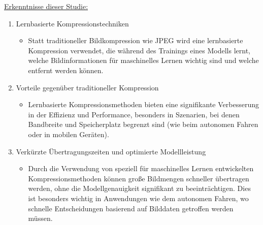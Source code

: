         \underline{Erkenntnisse dieser Studie:}
        \begin{enumerate}
            \item Lernbasierte Kompressionstechniken
            \begin{itemize}
                \item Statt traditioneller Bildkompression wie JPEG wird eine lernbasierte Kompression verwendet, die während des Trainings eines Modells lernt, welche Bildinformationen für maschinelles Lernen wichtig sind und welche entfernt werden können.
            \end{itemize}
            \item Vorteile gegenüber traditioneller Kompression
            \begin{itemize}
                \item Lernbasierte Kompressionsmethoden bieten eine signifikante Verbesserung in der Effizienz und Performance, besonders in Szenarien, bei denen Bandbreite und Speicherplatz begrenzt sind (wie beim autonomen Fahren oder in mobilen Geräten).
            \end{itemize}
            \item Verkürzte Übertragungszeiten und optimierte Modellleistung
            \begin{itemize}
                \item Durch die Verwendung von speziell für maschinelles Lernen entwickelten Kompressionsmethoden können große Bildmengen schneller übertragen werden, ohne die Modellgenauigkeit signifikant zu beeinträchtigen. Dies ist besonders wichtig in Anwendungen wie dem autonomen Fahren, wo schnelle Entscheidungen basierend auf Bilddaten getroffen werden müssen.
            \end{itemize}
        \end{enumerate}      